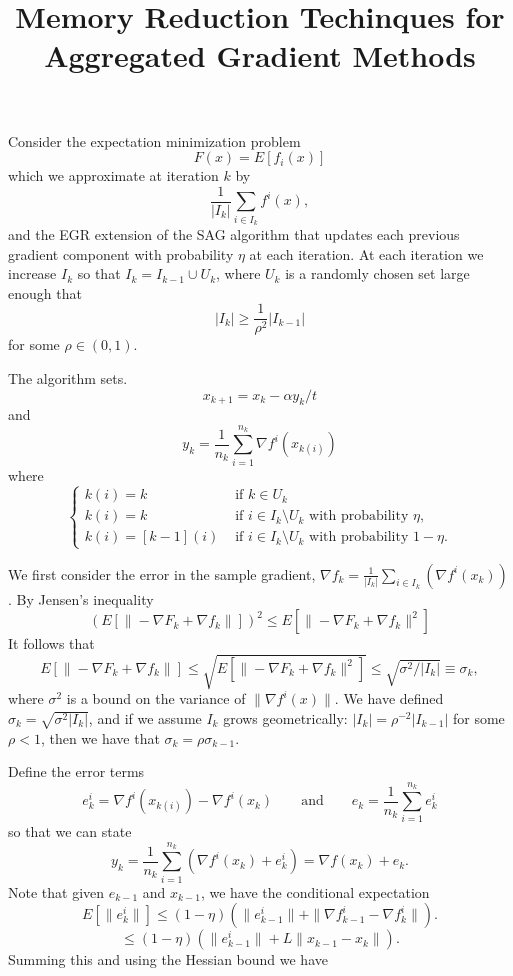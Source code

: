 \documentclass[11pt]{article}
\title{Memory Reduction Techinques for Aggregated Gradient Methods}
\begin{document}
	\noindent 
	Consider the expectation minimization problem 
	\[
	 F(x) = E[ f_i(x) ]
	\]
	which we approximate at iteration $k$ by
	\[
	  \frac{1}{|I_k|}\sum_{i\in I_k} f^i(x),
	\]
	and the EGR extension of the SAG algorithm that updates each previous gradient component with probability $\eta$ at each iteration.
	At each iteration we increase $I_k$ so that $I_k=I_{k-1} \cup U_k$, where $U_k$ is a randomly chosen set large enough that 
	\begin{equation}   \label{Igrowth}
	 |I_k| \geq \frac{1}{\rho^2} |I_{k-1}| 
	 \end{equation}
	 for some $\rho \in( 0,1)$.

	The algorithm sets.
	\[
	 x_{k+1} = x_k -\alpha y_k/t
	\]
	and
	\[
	 y_k = \frac{1}{n_k}\sum_{i=1}^{n_k}  \nabla f^i(x_{k(i)}) 
	\]
	where
	\[
	 \begin{cases}
	  k(i)=k &\mbox{ if } k\in U_k \\
	  k(i) = k  & \mbox{ if } i \in I_k \setminus U_k \mbox{  with probability }\eta,\\
	  k(i) = [k-1](i) &\mbox{ if } i \in I_k \setminus U_k \mbox{ with probability }1-\eta.
	 \end{cases}
	\]

	We first consider the error in the sample gradient, $\nabla f_k = \frac{1}{|I_k|}\sum_{i\in I_k}(\nabla f^i(x_k))$.
	By Jensen's inequality
	\[
	(E[\|-\nabla F_{k}+\nabla f_{k} \|])^2 \leq E[\|-\nabla F_{k}+\nabla f_{k} \|^2] 
	\]
	It follows that 
	\begin{equation}  \label{truegrad}
	E[\|-\nabla F_{k}+\nabla f_{k} \|] \leq \sqrt {E[\|-\nabla F_{k}+\nabla f_{k} \|^2] }\leq  \sqrt{\sigma ^2/|I_k|} \equiv \sigma_k ,
	\end{equation}
	where $\sigma^2$ is a bound on the variance of $\|\nabla f^i(x)\|$. We have defined $\sigma_k = \sqrt{\sigma ^2|I_k|}$, 
	and if  we assume $I_k$ grows geometrically: $| I_k|= \rho^{-2} |I_{k-1}|$ for some $\rho <1$, then we have that 
	$\sigma_k = \rho \sigma_{k-1}$.

	\bigskip

	\noindent
	Define the error terms 
	\[
	 e_k^i = \nabla f^i(x_{k(i)})-\nabla f^i(x_k) \qquad \mbox{and} \qquad e_k=\frac{1}{{n_k}}\sum_{i=1}^{n_k} e_k^i
	\]
	so that we can state 
	\[
	 y_k = \frac{1}{{n_k}}\sum_{i=1}^{n_k} (\nabla f^i(x_k)+e_k^i) = \nabla f(x_k) + e_k.
	\]
	Note that given $e_{k-1}$ and $x_{k-1}$, we have the conditional expectation 
	\[
	 E[\|e_k^i\|] \leq (1-\eta)(\|e_{k-1}^i\| +\| \nabla f_{k-1}^i - \nabla f_k^i\|).
	\]
	\[
	 \leq (1-\eta)(\|e_{k-1}^i\| + L \| x_{k-1} - x_k\|).
	\]
	Summing this and using the Hessian bound we have
\end{document}
